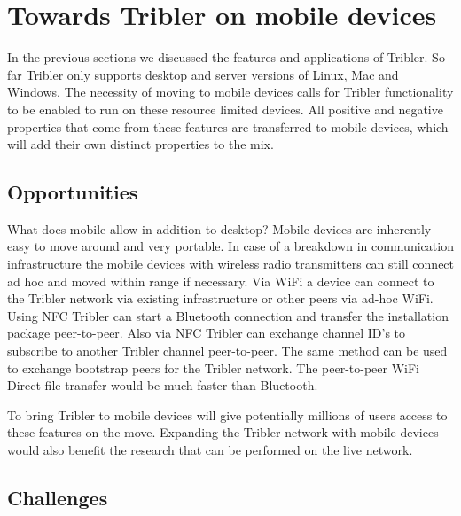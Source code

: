 \section{Towards Tribler on mobile devices}
\label{ch:tribler_mobile}

In the previous sections we discussed the features and applications of Tribler.
So far Tribler only supports desktop and server versions of Linux, Mac and Windows.
The necessity of moving to mobile devices calls for Tribler functionality to be enabled to run on these resource limited devices.
All positive and negative properties that come from these features are transferred to mobile devices, which will add their own distinct properties to the mix.



\subsection{Opportunities}

What does mobile allow in addition to desktop?
Mobile devices are inherently easy to move around and very portable.
In case of a breakdown in communication infrastructure the mobile devices with wireless radio transmitters can still connect ad hoc and moved within range if necessary.
Via WiFi a device can connect to the Tribler network via existing infrastructure or other peers via ad-hoc WiFi.
Using NFC Tribler can start a Bluetooth connection and transfer the installation package peer-to-peer.
Also via NFC Tribler can exchange channel ID's to subscribe to another Tribler channel peer-to-peer.
The same method can be used to exchange bootstrap peers for the Tribler network.
The peer-to-peer WiFi Direct file transfer would be much faster than Bluetooth.


To bring Tribler to mobile devices will give potentially millions of users access to these features on the move.
Expanding the Tribler network with mobile devices would also benefit the research that can be performed on the live network.


\subsection{Challenges}

